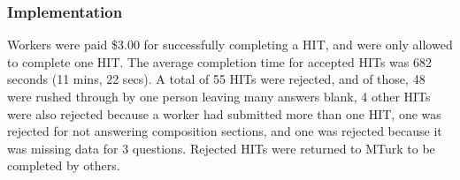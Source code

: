 \subsubsection{Implementation}
Workers were paid \$3.00 for successfully completing a HIT, and were only allowed to complete  one HIT.  The average completion time for accepted HITs was 682 seconds (11 mins, 22 secs).
A total of 55 HITs were rejected, and  of those, 48 were rushed through by one person leaving many answers blank, 4 other HITs were also rejected because a worker had submitted more than one HIT, one was rejected for not answering composition sections, and one was rejected because it was missing data for 3 questions.  Rejected HITs were returned to MTurk to be completed by others.


